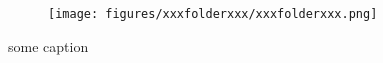 \begin{figure}[bt]
\centering

\begin{subfigure}{0.49\textwidth}
    \centering
    \texttt{[image: figures/xxxfolderxxx/xxxfolderxxx.png]}
\end{subfigure}

    \caption{some caption
    \label{fig:xxxfolderxxx}}

\end{figure}    

